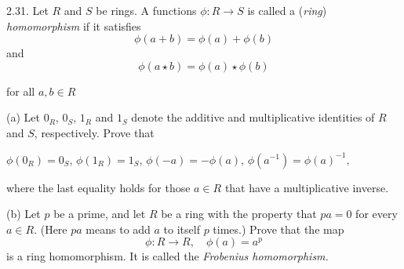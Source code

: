 2.31. Let $R$ and $S$ be rings. A functions 
    $\phi: R \rightarrow S$ is called a (\textit{ring}) \textit{homomorphism} if it satisfies 
    \[\phi(a+b)=\phi(a) + \phi(b)\] and \[ \phi(a \star b) = \phi(a) \star \phi(b)\] 
    
    for all $a, b \in R$

(a) Let $0_R$, $0_S$, $1_R$ and $1_S$ denote the additive and multiplicative identities of $R$ and $S$, respectively. Prove that
        
$\phi(0_R)=0_S$, $\phi(1_R)=1_S$, $\phi(-a)=-\phi(a)$, $\phi(a^{-1})=\phi(a)^{-1},$
    
where the last equality holds for those $a \in R$ that have a multiplicative inverse.

(b) Let $p$ be a prime, and let $R$ be a ring with the property that $pa = 0$ for every $a \in R$. (Here $pa$ means to add $a$ to itself $p$ times.) Prove that the map 
        \[\phi: R \rightarrow R, \quad \phi(a)=a^p\]
    is a ring homomorphism. It is called the \textit{Frobenius homomorphism.}

